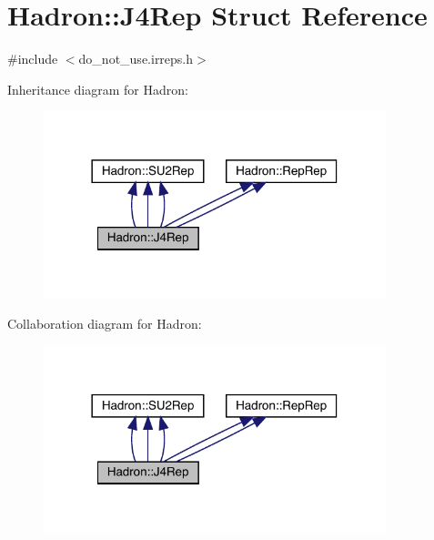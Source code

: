 \hypertarget{structHadron_1_1J4Rep}{}\section{Hadron\+:\+:J4\+Rep Struct Reference}
\label{structHadron_1_1J4Rep}


{\ttfamily \#include $<$do\+\_\+not\+\_\+use.\+irreps.\+h$>$}



Inheritance diagram for Hadron\+:
\nopagebreak
\begin{figure}[H]
\begin{center}
\leavevmode
\includegraphics[width=282pt]{dd/d4f/structHadron_1_1J4Rep__inherit__graph}
\end{center}
\end{figure}


Collaboration diagram for Hadron\+:
\nopagebreak
\begin{figure}[H]
\begin{center}
\leavevmode
\includegraphics[width=282pt]{db/df8/structHadron_1_1J4Rep__coll__graph}
\end{center}
\end{figure}
